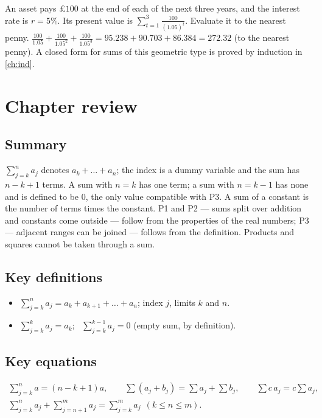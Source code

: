 \begin{example}
An asset pays $\pounds100$ at the end of each of the next three years, and the interest rate is $r=5\%$. Its present
value is $\sum_{t=1}^{3}\frac{100}{(1.05)^t}$. Evaluate it to the nearest penny.
\solution
$\frac{100}{1.05}+\frac{100}{1.05^2}+\frac{100}{1.05^3}=95.238+90.703+86.384=272.32$ (to the nearest penny). A
closed form for sums of this geometric type is proved by induction in \cref{ch:ind}.
\end{example}

\section{Chapter review}
\subsection*{Summary}
$\sum_{j=k}^n a_j$ denotes $a_k+\dots+a_n$; the index is a dummy variable and the sum has $n-k+1$ terms. A sum with
$n=k$ has one term; a sum with $n=k-1$ has none and is defined to be $0$, the only value compatible with P3. A sum of
a constant is the number of terms times the constant. P1 and P2 --- sums split over addition and constants come
outside --- follow from the properties of the real numbers; P3 --- adjacent ranges can be joined --- follows from the
definition. Products and squares cannot be taken through a sum.

\subsection*{Key definitions}
\begin{itemize}
  \item $\sum_{j=k}^{n}a_j=a_k+a_{k+1}+\dots+a_n$; index $j$, limits $k$ and $n$.
  \item $\sum_{j=k}^{k}a_j=a_k$; \ $\sum_{j=k}^{k-1}a_j=0$ (empty sum, by definition).
\end{itemize}

\subsection*{Key equations}
\begin{gather*}
\sum_{j=k}^{n}a=(n-k+1)a,\qquad \sum(a_j+b_j)=\sum a_j+\sum b_j,\qquad \sum c\,a_j=c\sum a_j,\\
\sum_{j=k}^{n}a_j+\sum_{j=n+1}^{m}a_j=\sum_{j=k}^{m}a_j\ \ (k\le n\le m).
\end{gather*}

